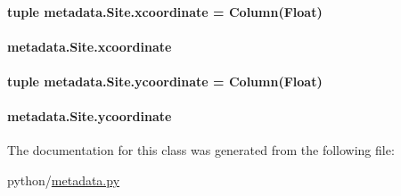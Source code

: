 \hypertarget{classmetadata_1_1Site_a9144cfa0d11cb0cc7002ae75271421da}{
\paragraph[{xcoordinate}]{\setlength{\rightskip}{0pt plus 5cm}tuple metadata.\-Site.\-xcoordinate = Column(Float)\hspace{0.3cm}{\ttfamily [static]}}}\label{classmetadata_1_1Site_a9144cfa0d11cb0cc7002ae75271421da}
\hypertarget{classmetadata_1_1Site_a4bd6d28c540b025bb434c73009e43323}{
\paragraph[{xcoordinate}]{\setlength{\rightskip}{0pt plus 5cm}metadata.\-Site.\-xcoordinate}}\label{classmetadata_1_1Site_a4bd6d28c540b025bb434c73009e43323}
\hypertarget{classmetadata_1_1Site_af307dcfdd1fb80f86674dca8a53b6f43}{
\paragraph[{ycoordinate}]{\setlength{\rightskip}{0pt plus 5cm}tuple metadata.\-Site.\-ycoordinate = Column(Float)\hspace{0.3cm}{\ttfamily [static]}}}\label{classmetadata_1_1Site_af307dcfdd1fb80f86674dca8a53b6f43}
\hypertarget{classmetadata_1_1Site_a69815891e74eb04ed78c879ad495ddc7}{
\paragraph[{ycoordinate}]{\setlength{\rightskip}{0pt plus 5cm}metadata.\-Site.\-ycoordinate}}\label{classmetadata_1_1Site_a69815891e74eb04ed78c879ad495ddc7}


The documentation for this class was generated from the following file\-:\begin{DoxyCompactItemize}
\item 
python/\hyperlink{metadata_8py}{metadata.\-py}\end{DoxyCompactItemize}
